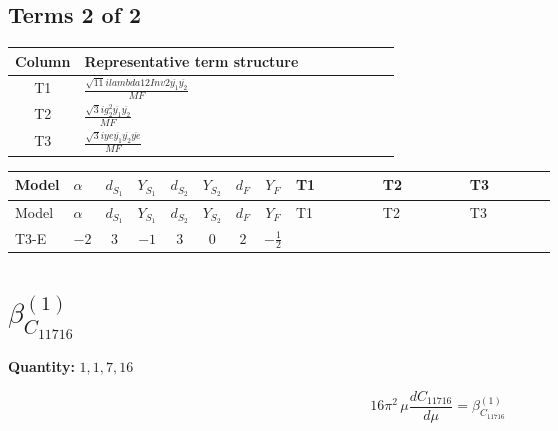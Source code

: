\documentclass[8pt]{article}
\begin{document}
\begin{landscape}
\subsection*{Terms 2 of 2}
\begin{center}
\begin{tabular}{@{}c >{\raggedright\arraybackslash}p{0.82\linewidth}@{}}
\toprule
Column & Representative term structure \\
\midrule
T1 & \(\displaystyle \frac{\sqrt{11} i lambda12Inv2 \overline{y_{1}} \overline{y_{2}}}{MF}\) \\
\midrule
T2 & \(\displaystyle \frac{\sqrt{3} i g_{2}^{2} \overline{y_{1}} \overline{y_{2}}}{MF}\) \\
\midrule
T3 & \(\displaystyle \frac{\sqrt{3} i ye \overline{y_{1}} \overline{y_{2}} \overline{ye}}{MF}\) \\
\midrule
\bottomrule
\end{tabular}
\end{center}
\smallskip
\tiny
\begin{longtable}{@{}llcccccc >{\raggedright\arraybackslash}p{0.21\linewidth} >{\raggedright\arraybackslash}p{0.21\linewidth} >{\raggedright\arraybackslash}p{0.21\linewidth}@{}}
\toprule
Model & $\alpha$ & $d_{S_1}$ & $Y_{S_1}$ & $d_{S_2}$ & $Y_{S_2}$ & $d_F$ & $Y_F$ & T1 & T2 & T3 \\
\midrule
\endfirsthead
\toprule
Model & $\alpha$ & $d_{S_1}$ & $Y_{S_1}$ & $d_{S_2}$ & $Y_{S_2}$ & $d_F$ & $Y_F$ & T1 & T2 & T3 \\
\midrule
\endhead
T3-E & $-2$ & $3$ & $-1$ & $3$ & $0$ & $2$ & $-\frac{1}{2}$ & \scriptsize\adjustbox{max width=\linewidth}{$\begin{gathered} \frac{3 \sqrt{11} i lambda12Inv2 \overline{y_{1}} \overline{y_{2}}}{22 MF}\end{gathered}$} & \scriptsize\adjustbox{max width=\linewidth}{$\begin{gathered} \frac{11 \sqrt{3} i g_{2}^{2} \overline{y_{1}} \overline{y_{2}}}{8 MF}\end{gathered}$} & \scriptsize\adjustbox{max width=\linewidth}{$\begin{gathered} - \frac{\sqrt{3} i ye \overline{y_{1}} \overline{y_{2}} \overline{ye}}{12 MF}\end{gathered}$} \\
\midrule
\bottomrule
\end{longtable}
\clearpage
\section*{$\beta_{C_{11716}}^{(1)}$}
\noindent\textbf{Quantity: }$\mathrm{1,1,7,16}$\par\smallskip
\[16\pi^2\,\mu\frac{d C_{11716}}{d\mu}=\beta_{C_{11716}}^{(1)}\]

\end{landscape}
\end{document}
